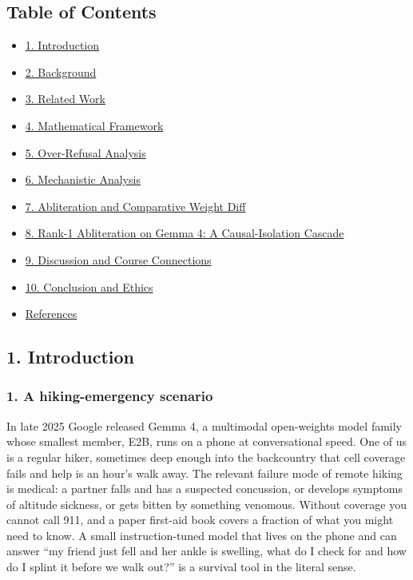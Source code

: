 \documentclass[
  11pt,
]{article}
\providecommand{\tightlist}{%
  \setlength{\itemsep}{0pt}\setlength{\parskip}{0pt}}
\begin{document}
\subsection{Table of Contents}\label{table-of-contents}

\begin{itemize}
\tightlist
\item
  \hyperref[1-introduction]{1. Introduction}
\item
  \hyperref[2-background]{2. Background}
\item
  \hyperref[3-related-work]{3. Related Work}
\item
  \hyperref[4-mathematical-framework]{4. Mathematical Framework}
\item
  \hyperref[5-over-refusal-analysis]{5. Over-Refusal Analysis}
\item
  \hyperref[6-mechanistic-analysis]{6. Mechanistic Analysis}
\item
  \hyperref[7-abliteration-and-comparative-weight-diff]{7. Abliteration
  and Comparative Weight Diff}
\item
  \hyperref[8-rank-1-abliteration-on-gemma-4-a-causal-isolation-cascade]{8.
  Rank-1 Abliteration on Gemma 4: A Causal-Isolation Cascade}
\item
  \hyperref[9-discussion-and-course-connections]{9. Discussion and
  Course Connections}
\item
  \hyperref[10-conclusion-and-ethics]{10. Conclusion and Ethics}
\item
  \hyperref[references]{References}
\end{itemize}

\subsection{1. Introduction}\label{introduction}

\subsubsection{1. A hiking-emergency
scenario}\label{a-hiking-emergency-scenario}

In late 2025 Google released Gemma 4, a multimodal open-weights model
family whose smallest member, E2B, runs on a phone at conversational
speed. One of us is a regular hiker, sometimes deep enough into the
backcountry that cell coverage fails and help is an hour's walk away.
The relevant failure mode of remote hiking is medical: a partner falls
and has a suspected concussion, or develops symptoms of altitude
sickness, or gets bitten by something venomous. Without coverage you
cannot call 911, and a paper first-aid book covers a fraction of what
you might need to know. A small instruction-tuned model that lives on
the phone and can answer ``my friend just fell and her ankle is
swelling, what do I check for and how do I splint it before we walk
out?'' is a survival tool in the literal sense.
\end{document}
